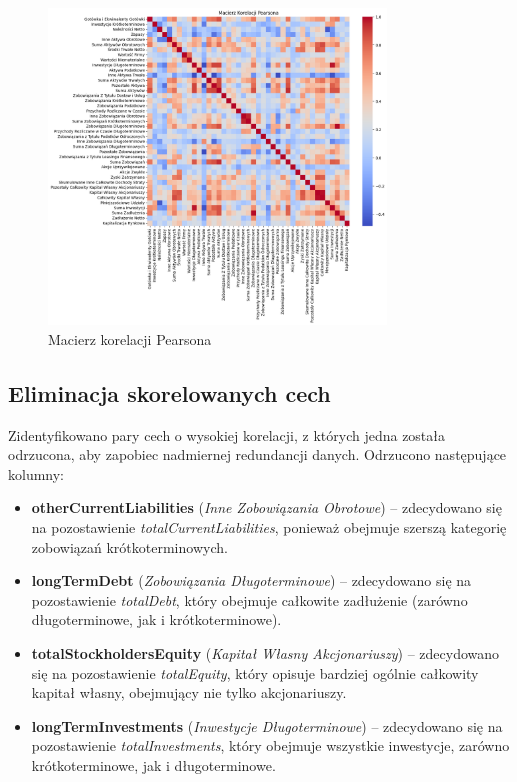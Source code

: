 \documentclass[12pt]{article}
\begin{document}
\begin{figure}[h]
    \centering
    \includegraphics[width=0.8\textwidth]{docs/img/pearson-correlation.png}
    \caption{Macierz korelacji Pearsona}
    \label{fig:pearson_corr}
\end{figure}

\subsection{Eliminacja skorelowanych cech}

Zidentyfikowano pary cech o wysokiej korelacji, z których jedna została odrzucona, aby zapobiec nadmiernej redundancji danych. Odrzucono następujące kolumny:
\begin{itemize}
    \item \textbf{otherCurrentLiabilities} (\emph{Inne Zobowiązania Obrotowe}) – zdecydowano się na pozostawienie \emph{totalCurrentLiabilities}, ponieważ obejmuje szerszą kategorię zobowiązań krótkoterminowych.
    \item \textbf{longTermDebt} (\emph{Zobowiązania Długoterminowe}) – zdecydowano się na pozostawienie \emph{totalDebt}, który obejmuje całkowite zadłużenie (zarówno długoterminowe, jak i krótkoterminowe).
    \item \textbf{totalStockholdersEquity} (\emph{Kapitał Własny Akcjonariuszy}) – zdecydowano się na pozostawienie \emph{totalEquity}, który opisuje bardziej ogólnie całkowity kapitał własny, obejmujący nie tylko akcjonariuszy.
    \item \textbf{longTermInvestments} (\emph{Inwestycje Długoterminowe}) – zdecydowano się na pozostawienie \emph{totalInvestments}, który obejmuje wszystkie inwestycje, zarówno krótkoterminowe, jak i długoterminowe.
\end{itemize}
\end{document}
